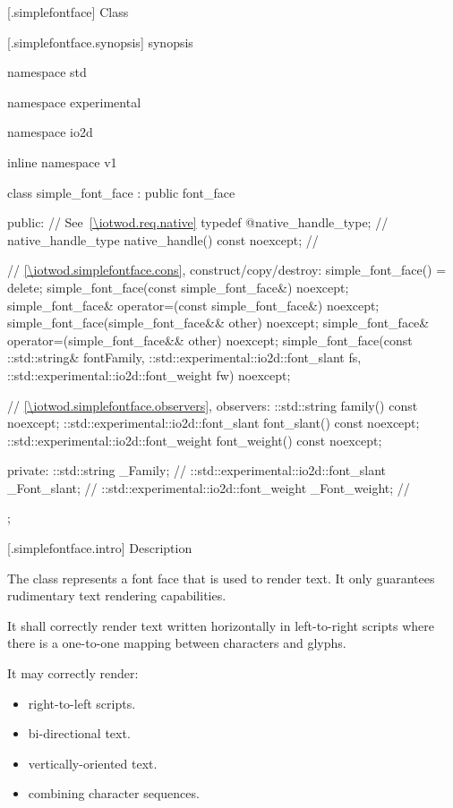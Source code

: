  [\iotwod.simplefontface] {Class }

 [\iotwod.simplefontface.synopsis] { synopsis}

\begin{codeblock}
namespace std { namespace experimental { namespace io2d { inline namespace v1 {
  class simple_font_face : public font_face {
  public:
    // See~\ref{\iotwod.req.native}
    typedef @\impdef@ native_handle_type; // \expos
    native_handle_type native_handle() const noexcept; // \expos
    
    // \ref{\iotwod.simplefontface.cons}, construct/copy/destroy:
    simple_font_face() = delete;
    simple_font_face(const simple_font_face&) noexcept;
    simple_font_face& operator=(const simple_font_face&) noexcept;
    simple_font_face(simple_font_face&& other) noexcept;
    simple_font_face& operator=(simple_font_face&& other) noexcept;
    simple_font_face(const ::std::string& fontFamily,
      ::std::experimental::io2d::font_slant fs,
      ::std::experimental::io2d::font_weight fw) noexcept;

    // \ref{\iotwod.simplefontface.observers}, observers:
    ::std::string family() const noexcept;
    ::std::experimental::io2d::font_slant font_slant() const noexcept;
    ::std::experimental::io2d::font_weight font_weight() const noexcept;

  private:
    ::std::string _Family;                               // \expos
    ::std::experimental::io2d::font_slant _Font_slant;   // \expos
    ::std::experimental::io2d::font_weight _Font_weight; // \expos
  };
} } } }
\end{codeblock}

 [\iotwod.simplefontface.intro] { Description}

\pnum
{}
The  class represents a font face that is used to render text. It only guarantees rudimentary text rendering capabilities.

\pnum
It shall correctly render text written horizontally in left-to-right scripts where there is a one-to-one mapping between characters and glyphs.

\pnum
It may correctly render:
\begin{itemize}
	\item right-to-left scripts.
	\item bi-directional text.
	\item vertically-oriented text.
	\item combining character sequences.
\end{itemize}

